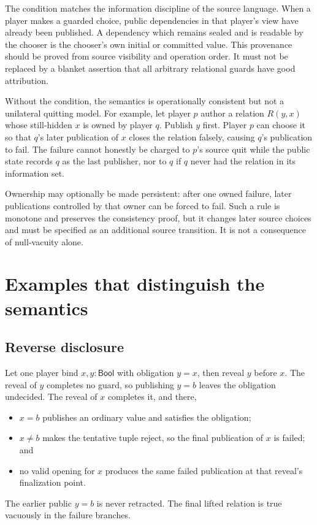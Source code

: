 \documentclass[11pt]{article}
\begin{document}
The condition matches the information discipline of the source language.  When
a player makes a guarded choice, public dependencies in that player's view have
already been published.  A dependency which remains sealed and is readable by
the chooser is the chooser's own initial or committed value.
This provenance should be proved from source visibility and operation order.
It must not be replaced by a blanket assertion that all arbitrary relational
guards have good attribution.

Without the condition, the semantics is operationally consistent but not a
unilateral quitting model.  For example, let player $p$ author a relation
$R(y,x)$ whose still-hidden $x$ is owned by player $q$.  Publish $y$ first.
Player $p$ can choose it so that $q$'s later publication of $x$ closes the
relation falsely, causing $q$'s publication to fail.  The failure cannot honestly be
charged to $p$'s source quit while the public state records $q$ as the last
publisher, nor to $q$ if $q$ never had the relation in its information set.

Ownership may optionally be made persistent: after one owned failure, later
publications controlled by that owner can be forced to fail.  Such a rule is
monotone and preserves the consistency proof, but it changes later source
choices and must be specified as an additional source transition.  It is not a
consequence of null-vacuity alone.

\section{Examples that distinguish the semantics}

\subsection{Reverse disclosure}

Let one player bind $x,y:\mathsf{Bool}$ with obligation $y=x$, then reveal $y$
before $x$.  The reveal of $y$ completes no guard, so publishing $y=b$ leaves
the obligation undecided.  The reveal of $x$ completes it, and there,
\begin{itemize}
\item $x=b$ publishes an ordinary value and satisfies the obligation;
\item $x\ne b$ makes the tentative tuple reject, so the final publication of
      $x$ is failed; and
\item no valid opening for $x$ produces the same failed publication at that
      reveal's finalization point.
\end{itemize}
The earlier public $y=b$ is never retracted.  The final lifted relation is true
vacuously in the failure branches.
\end{document}
